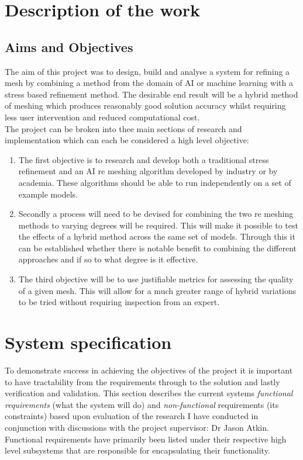 
\section{Description of the work}
\subsection{Aims and Objectives}
The aim of this project was to design, build and analyse a system for refining a mesh by combining a method from the domain of AI or machine learning with a stress based refinement method. The desirable end result will be a hybrid method of meshing which produces reasonably good solution accuracy whilst requiring less user intervention and reduced computational cost.\\

\noindent
The project can be broken into thee main sections of research and implementation which can each be considered a high level objective:\\ 

\begin{enumerate}[label=\Alph*]

\item The first objective is to research and develop both a traditional stress refinement and an AI re meshing algorithm developed by industry or by academia. These algorithms should be able to run independently on a set of example models.

\item Secondly a process will need to be devised for combining the two re meshing methods to varying degrees will be required. This will make it possible to test the effects of a hybrid method across the same set of models. Through this it can be established whether there is notable benefit to combining the different approaches and if so to what degree is it effective.

\item The third objective will be to use justifiable metrics for assessing the quality of a given mesh. This will allow for a much greater range of hybrid variations to be tried without requiring inspection from an expert. 
\end{enumerate}

\section{System specification}
To demonstrate success in achieving the objectives of the project it is important to have tractability from the requirements through to the solution and lastly verification and validation. This section describes the current systems \textit{functional requirements} (what the system will do) and \textit{non-functional} requirements (its constraints) based upon evaluation of the research I have conducted in conjunction with discussions with the project supervisor: Dr Jason Atkin. Functional requirements have primarily been listed under their respective high level subsystems that are responsible for encapsulating their functionality. \\ 

